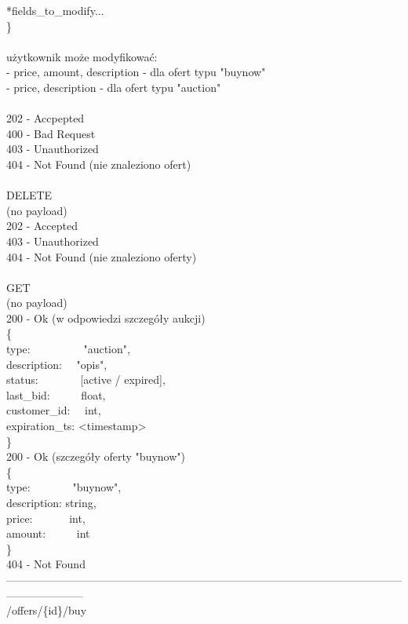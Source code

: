 \documentclass[12pt, notitlepage]{article}
\begin{document}
\begin{appendices}
{\indent    **fields\_to\_modify...\\
\}\\
\\
użytkownik może modyfikować:\\
- price, amount, description - dla ofert typu "buynow"\\
- price, description -  dla ofert typu "auction"\\
\\
202 - Accpepted\\
400 - Bad Request\\
403 - Unauthorized\\
404 - Not Found (nie znaleziono ofert)\\
\\
DELETE\\
(no payload)\\
202 - Accepted\\
403 - Unauthorized\\
404 - Not Found (nie znaleziono oferty)\\
\\
GET\\
(no payload)\\
200 - Ok (w odpowiedzi szczegóły aukcji)\\
\{	\\
\indent    type: \ \ \ \ \ \ \ \ \ "auction",\\
\indent    description: \ \ "opis",\\
\indent    status: \ \ \ \ \ \ \ [active / expired],\\
\indent    last\_bid: \ \ \ \ \ float,\\
\indent    customer\_id: \ \ int,\\
\indent    expiration\_ts: <timestamp>\\
\}\\
200 - Ok (szczegóły oferty "buynow")\\
\{	\\
\indent type: \ \ \ \ \ \ \ "buynow",\\
\indent description: string,\\
\indent	price: \ \ \ \ \ \ int,        \\
\indent	amount: \ \ \ \ \ int\\
\}\\
404 - Not Found\\
---------------------------------------------------------------------------------------------------------------------------------\\
/offers/\{id\}/buy\\
}
\end{appendices}
\end{document}
